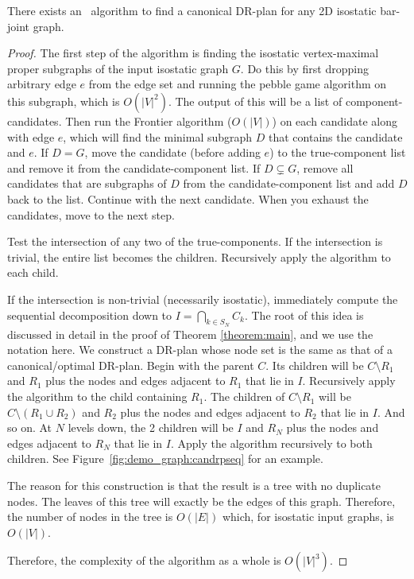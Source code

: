 \begin{theorem}\label{theorem:algo_complexity}
    There exists an \candrpcomplexityv\ algorithm to find a canonical DR-plan for any 2D isostatic bar-joint graph.
\end{theorem}


\begin{proof}
The first step of the algorithm is finding the isostatic vertex-maximal proper subgraphs of the input isostatic graph $G$. Do this by first dropping arbitrary edge $e$ from the edge set and running the pebble game algorithm \cite{Jacobs:1997:PG} on this subgraph, which is $O(|V|^2)$. The output of this will be a list of component-candidates. Then run the Frontier algorithm \cite{hoffman2001decompositionII} \cite{lomonosov2004graph} ($O(|V|)$) on each candidate along with edge $e$, which will find the minimal subgraph $D$ that contains the candidate and $e$. If $D=G$, move the candidate (before adding $e$) to the true-component list and remove it from the candidate-component list. If $D\subsetneq G$, remove all candidates that are subgraphs of $D$ from the candidate-component list and add $D$ back to the list. Continue with the next candidate. When you exhaust the candidates, move to the next step.

Test the intersection of any two of the true-components. If the intersection is trivial, the entire list becomes the children. Recursively apply the algorithm to each child.

If the intersection is non-trivial (necessarily isostatic), immediately compute the sequential decomposition down to $I=\bigcap_{k\in S_N}{C_k}$. The root of this idea is discussed in detail in the proof of Theorem \ref{theorem:main}, and we use the notation here. We construct a DR-plan whose node set is the same as that of a canonical/optimal DR-plan. Begin with the parent $C$. Its children will be $C\setminus R_1$ and $R_1$ plus the nodes and edges adjacent to $R_1$ that lie in $I$. Recursively apply the algorithm to the child containing $R_1$. The children of $C\setminus R_1$ will be $C\setminus (R_1\cup R_2)$ and $R_2$ plus the nodes and edges adjacent to $R_2$ that lie in $I$. And so on. At $N$ levels down, the 2 children will be $I$ and $R_N$ plus the nodes and edges adjacent to $R_N$ that lie in $I$. Apply the algorithm recursively to both children. See Figure~\ref{fig:demo_graph:candrpseq} for an example.

The reason for this construction is that the result is a tree with no duplicate nodes. The leaves of this tree will exactly be the edges of this graph. Therefore, the number of nodes in the tree is $O(|E|)$ which, for isostatic input graphs, is $O(|V|)$.

Therefore, the complexity of the algorithm as a whole is $O(|V|^3)$.
%
\end{proof}


